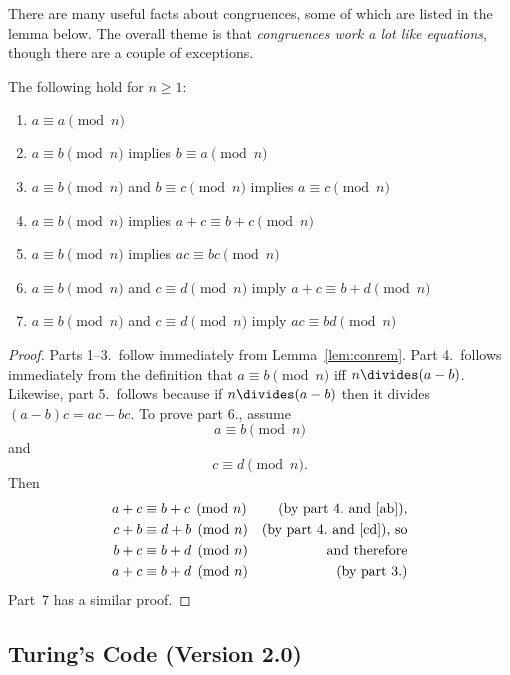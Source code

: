 There are many useful facts about congruences, some of which are listed in
the lemma below.  The overall theme is that \emph{congruences work a lot
like equations}, though there are a couple of exceptions.

\begin{lemma}  The following  hold for
$n \geq 1$:
%
\begin{enumerate}
\item $a \equiv a \pmod{n}$
\item $a \equiv b \pmod{n}$ implies $b \equiv a \pmod{n}$
\item $a \equiv b \pmod{n}$ and $b \equiv c \pmod{n}$ implies $a \equiv c \pmod{n}$
\item $a \equiv b \pmod{n}$ implies $a + c \equiv b + c \pmod{n}$
\item $a \equiv b \pmod{n}$ implies $a c \equiv b c \pmod{n}$
\item $a \equiv b \pmod{n}$ and $c \equiv d \pmod{n}$ imply $a + c
\equiv b + d \pmod{n}$
\item $a \equiv b \pmod{n}$ and $c \equiv d \pmod{n}$ imply $a c
\equiv b d \pmod{n}$
\end{enumerate}
\end{lemma}

\begin{proof}
Parts 1--3.\ follow immediately from Lemma~\ref{lem:conrem}.  Part 4.\
follows immediately from the definition that $a \equiv b \pmod{n}$ iff $n
\divides (a-b)$.  Likewise, part 5.\ follows because if $n \divides (a-b)$
then it divides $(a-b)c = ac - bc$.  To prove part 6., assume
\begin{equation}\label{ab}
a \equiv b \pmod{n}
\end{equation}
and
\begin{equation}\label{cd}
c \equiv d \pmod{n}.
\end{equation}
Then
\begin{align*}
a + c & \equiv b + c \pmod{n} & \text{(by part 4.\ and~\eqref{ab}}),\\
c + b & \equiv d + b \pmod{n} & \text{(by part 4.\ and~\eqref{cd}), so}\\
b + c & \equiv b + d \pmod{n} & \text{and therefore}\\
a + c & \equiv b + d \pmod{n} & \text{(by part 3.)}
\end{align*}
Part~7 has a similar proof.
\end{proof}

\subsection{Turing's Code (Version 2.0)}

